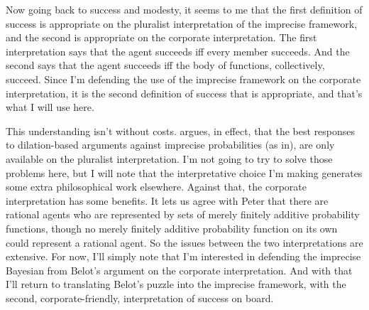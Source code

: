 \documentclass{ergoclass}
\begin{document}
Now going back to success and modesty, it seems to me that the first definition of success is appropriate on the pluralist interpretation of the imprecise framework, and the second is appropriate on the corporate interpretation. The first interpretation says that the agent succeeds iff every member succeeds. And the second says that the agent succeeds iff the body of functions, collectively, succeed. Since I'm defending the use of the imprecise framework on the corporate interpretation, it is the second definition of success that is appropriate, and that's what I will use here.

This understanding isn't without costs.\citet{Bradley2014} argues, in effect, that the best responses to dilation-based arguments against imprecise probabilities (as in\citealt{White2010}), %
are only available on the pluralist interpretation. I'm not going to try to solve those problems here, but I will note that the interpretative choice I'm making generates some extra philosophical work elsewhere. Against that, the corporate interpretation has some benefits. It lets us agree with Peter\cite{Walley1991} that there are rational agents who are represented by sets of merely finitely additive probability functions, though no merely finitely additive probability function on its own could represent a rational agent. So the issues between the two interpretations are extensive. For now, I'll simply note that I'm interested in defending the imprecise Bayesian from Belot's argument on the corporate interpretation. And with that I'll return to translating Belot's puzzle into the imprecise framework, with the second, corporate-friendly, interpretation of success on board.
\end{document}
